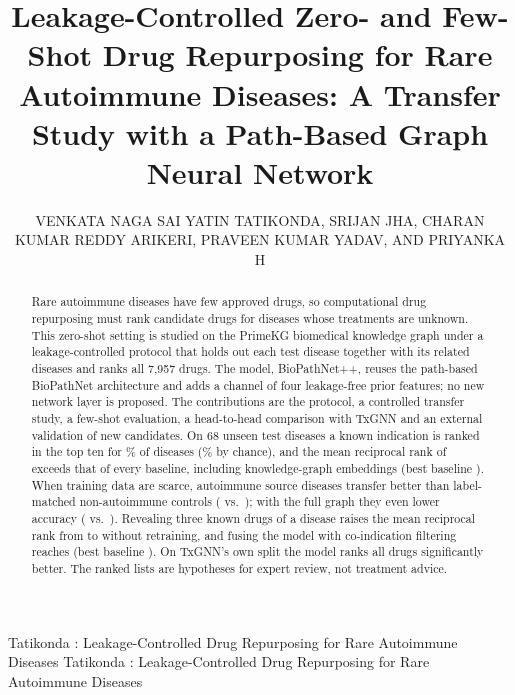 \documentclass{ieeeaccess}
\newcommand{\sysname}{BioPathNet++\xspace}
\begin{document}

\title{Leakage-Controlled Zero- and Few-Shot Drug Repurposing for Rare Autoimmune Diseases: A Transfer Study with a Path-Based Graph Neural Network}
\author{\uppercase{Venkata Naga Sai Yatin Tatikonda}, \uppercase{Srijan Jha}, \uppercase{Charan Kumar Reddy Arikeri}, \uppercase{Praveen Kumar Yadav}, AND \uppercase{Priyanka H}}
\address[1]{Department of Computer Science and Engineering, PES University, Bengaluru, Karnataka, India}

\markboth
{Tatikonda \headeretal: Leakage-Controlled Drug Repurposing for Rare Autoimmune Diseases}
{Tatikonda \headeretal: Leakage-Controlled Drug Repurposing for Rare Autoimmune Diseases}


\begin{abstract}
Rare autoimmune diseases have few approved drugs, so computational drug repurposing must rank candidate drugs for diseases whose treatments are unknown. This zero-shot setting is studied on the PrimeKG biomedical knowledge graph under a leakage-controlled protocol that holds out each test disease together with its related diseases and ranks all 7,957 drugs. The model, \sysname, reuses the path-based BioPathNet architecture and adds a channel of four leakage-free prior features; no new network layer is proposed. The contributions are the protocol, a controlled transfer study, a few-shot evaluation, a head-to-head comparison with TxGNN and an external validation of new candidates. On 68 unseen test diseases a known indication is ranked in the top ten for \TabModelTestAnyTen\% of diseases (\RandExpAnyTenTest\% by chance), and the mean reciprocal rank of \TestMrr{} exceeds that of every baseline, including knowledge-graph embeddings (best baseline \KnnTestMrr). When training data are scarce, autoimmune source diseases transfer better than label-matched non-autoimmune controls (\TrAEMrr{} vs.\ \TrActlEMrr); with the full graph they even lower accuracy (\TrCEEMrr{} vs.\ \TrDEMrr). Revealing three known drugs of a disease raises the mean reciprocal rank from \FsBppZeroMrr{} to \FsBppThreeMrr{} without retraining, and fusing the model with co-indication filtering reaches \FsRrfThreeMrr{} (best baseline \FsKnnCoindThreeMrr). On TxGNN's own split the model ranks all drugs significantly better. The ranked lists are hypotheses for expert review, not treatment advice.
\end{abstract}
\end{document}
